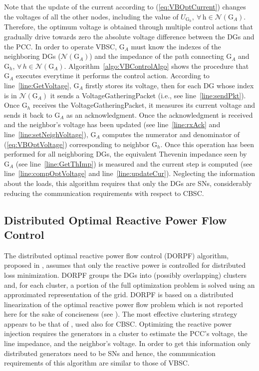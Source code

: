 \documentclass[journal]{IEEEtran}
\newcommand{\eq}[1]{(\ref{#1})}
\begin{document}
Note that the update of the current according to \eq{eq:VBOptCurrent} changes the voltages of all the other nodes, including the value of $U_{\text{G}_h},\ \forall \, \text{h} \in \mathcal N(\text{G}_A)$. Therefore, the optimum voltage is obtained through multiple control actions that gradually drive towards zero the absolute voltage difference between the DGs and the PCC. In order to operate VBSC, $\text{G}_A$ must know the indexes of the neighboring DGs ($\mathcal N(\text{G}_A)$) and the impedance of the path connecting $\text{G}_A$ and $\text{G}_h$, $\forall \, h\in \mathcal N(\text{G}_A)$. Algorithm~\ref{algo:VBControlAlgo} shows the procedure that $\text{G}_A$ executes everytime it performs the control action. According to line~\ref{line:GetVoltage},  $\text{G}_A$ firstly  stores its voltage, then for each DG whose index is in $\mathcal N(\text{G}_A)$ it sends a VoltageGatheringPacket (i.e., see line~\ref{line:sendPkt}). Once  $\text{G}_h$ receives the VoltageGatheringPacket, it measures its current voltage and sends it back to $\text{G}_A$ as an acknowledgment. Once the acknowledgment is received and the neighbor's voltage has been updated (see line~\ref{line:rxAck} and line~\ref{line:setNeighVoltage}), $\text{G}_A$ computes the numerator and denominator of \eq{eq:VBOptVoltage} corresponding to neighbor $\text{G}_h$. Once this operation has been performed for all neighboring DGs, the equivalent Thevenin impedance seen by $\text{G}_A$ (see line~\ref{line:GetThImp}) is measured and the current step is computed (see line~\ref{line:compOptVoltage} and line~\ref{line:updateCur}). Neglecting the information about the loads, this algorithm requires that only the DGs are SNs, considerably reducing the communication requirements with respect to CBSC.
\subsection{Distributed Optimal Reactive Power Flow Control}
\label{ssec:DORPFControl}
The distributed optimal reactive power flow control (DORPF) algorithm, proposed in \cite{DORPF}, assumes that only the reactive power is controlled for distributed loss minimization. DORPF groups the DGs into (possibly overlapping) clusters and, for each cluster,  a portion of the full optimization problem is solved using an approximated representation of the grid. DORPF is based on a distributed linearization of the optimal reactive power flow problem which is not reported here for the sake of conciseness (see \cite{DORPF}).  The most effective clustering strategy appears to be that of \cite{SurroundControl}, used also for CBSC. Optimizing the reactive power injection requires the generators in a cluster to estimate the PCC's voltage, the line impedance, and the neighbor's voltage. In order to get this information only distributed generators need to be SNs and hence, the communication requirements of this algorithm are similar to those of VBSC.
\end{document}
